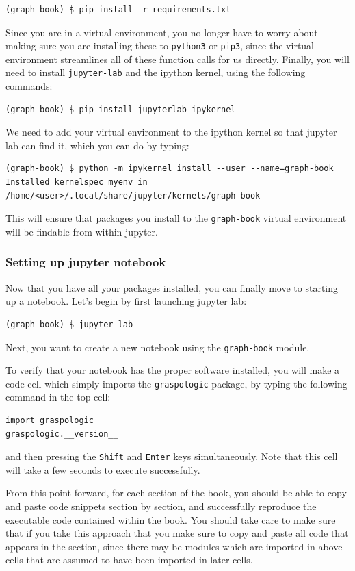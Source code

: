 \begin{lstlisting}[style=bash]
(graph-book) $ pip install -r requirements.txt
\end{lstlisting}

Since you are in a virtual environment, you no longer have to worry about making sure you are installing these to \texttt{python3} or \texttt{pip3}, since the virtual environment streamlines all of these function calls for us directly. Finally, you will need to install \texttt{jupyter-lab} and the ipython kernel, using the following commands:


\begin{lstlisting}[style=bash]
(graph-book) $ pip install jupyterlab ipykernel
\end{lstlisting}

We need to add your virtual environment to the ipython kernel so that jupyter lab can find it, which you can do by typing:


\begin{lstlisting}[style=bash]
(graph-book) $ python -m ipykernel install --user --name=graph-book
Installed kernelspec myenv in /home/<user>/.local/share/jupyter/kernels/graph-book
\end{lstlisting}

This will ensure that packages you install to the \texttt{graph-book} virtual environment will be findable from within jupyter.

\subsubsection{Setting up jupyter notebook}

Now that you have all your packages installed, you can finally move to starting up a notebook. Let's begin by first launching jupyter lab:

\begin{lstlisting}[style=bash]
(graph-book) $ jupyter-lab

\end{lstlisting}

Next, you want to create a new notebook using the \texttt{graph-book} module.

To verify that your notebook has the proper software installed, you will make a code cell which simply imports the \texttt{graspologic} package, by typing the following command in the top cell:

\begin{lstlisting}[style=bash]
import graspologic
graspologic.__version__
\end{lstlisting}

and then pressing the \texttt{Shift} and \texttt{Enter} keys simultaneously. Note that this cell will take a few seconds to execute successfully.


From this point forward, for each section of the book, you should be able to copy and paste code snippets section by section, and successfully reproduce the executable code contained within the book. You should take care to make sure that if you take this approach that you make sure to copy and paste all code that appears in the section, since there may be modules which are imported in above cells that are assumed to have been imported in later cells.

\newpage